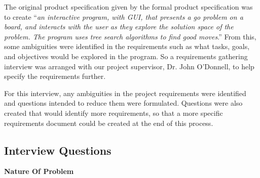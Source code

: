 \documentclass{l3proj}
\begin{document}
The original product specification given by the formal product specification was to create “\textit{an interactive program, with GUI, that presents a go problem on a board, and interacts with the user as they explore the solution space of the problem. The program uses tree search algorithms to find good moves}.”  From this, some ambiguities were identified in the requirements such as what tasks, goals, and objectives would be explored in the program. So a requirements gathering interview was arranged with our project supervisor, Dr. John O’Donnell, to help specify the requirements further.

For this interview, any ambiguities in the project requirements were identified and questions intended to reduce them were formulated.  Questions were also created that would identify more requirements, so that a more specific requirements document could be created at the end of this process.

\subsection{Interview Questions}

\textbf{Nature Of Problem}
\end{document}
